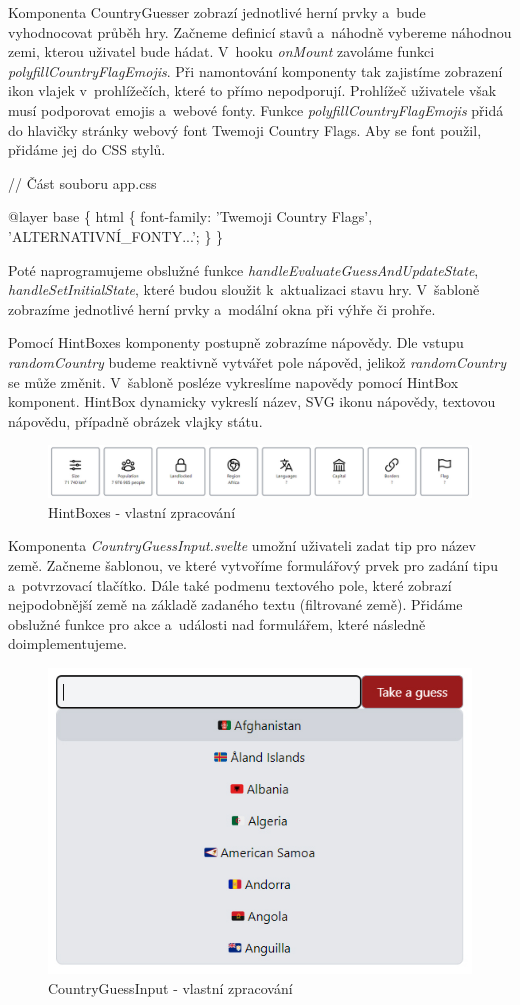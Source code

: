 Komponenta CountryGuesser zobrazí jednotlivé herní prvky a~bude vyhodnocovat průběh hry. 
Začneme definicí stavů a~náhodně vybereme náhodnou zemi, kterou uživatel bude hádat. 
V~hooku \emph{onMount} zavoláme funkci \emph{polyfillCountryFlagEmojis}. Při namontování komponenty tak zajistíme zobrazení ikon vlajek v~prohlížečích, které to přímo nepodporují. 
Prohlížeč uživatele však musí podporovat emojis a~webové fonty. Funkce \emph{polyfillCountryFlagEmojis} přidá do hlavičky stránky webový font Twemoji Country Flags. 
Aby se font použil, přidáme jej do CSS stylů.

\begin{prog}
// Část souboru app.css

@layer base \{
  html \{
    font-family: 'Twemoji Country Flags', 'ALTERNATIVNÍ_FONTY...';
  \}
\}
\end{prog}

Poté naprogramujeme obslužné funkce \emph{handleEvaluateGuessAndUpdateState}, \emph{handleSetInitialState}, které budou sloužit k~aktualizaci stavu hry. 
V~šabloně zobrazíme jednotlivé herní prvky a~modální okna při výhře či prohře.

Pomocí HintBoxes komponenty postupně zobrazíme nápovědy. Dle vstupu \emph{randomCountry} budeme reaktivně vytvářet pole nápověd, jelikož \emph{randomCountry} se může změnit. 
V~šabloně posléze vykreslíme napovědy pomocí HintBox komponent. HintBox dynamicky vykreslí název, SVG ikonu nápovědy, textovou nápovědu, případně obrázek vlajky státu.

\begin{figure}[htb]
	\centering
		\includegraphics[width=.97\textwidth]{images/HintBoxes.jpg}
	\caption[HintBoxes]{HintBoxes - vlastní zpracování}
	\label{fig:sveltehintboxes}
\end{figure}

Komponenta \emph{CountryGuessInput.svelte} umožní uživateli zadat tip pro název země. Začneme šablonou, ve které vytvoříme formulářový prvek pro zadání tipu a~potvrzovací tlačítko. 
Dále také podmenu textového pole, které zobrazí nejpodobnější země na základě zadaného textu (filtrované země). Přidáme obslužné funkce pro akce a~události nad formulářem, které následně doimplementujeme.

\begin{figure}[htb]
	\centering
		\includegraphics[width=.5\textwidth]{images/CountryGuessInput.jpg}
	\caption[CountryGuessInput]{CountryGuessInput - vlastní zpracování}
	\label{fig:sveltecountryguessinput}
\end{figure}

